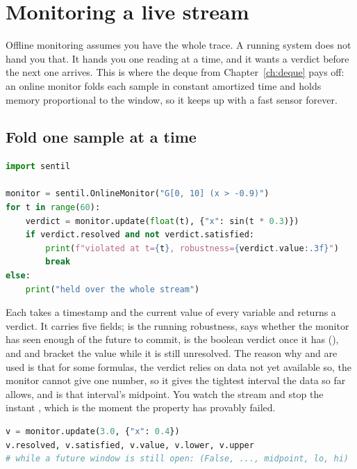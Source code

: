 \chapter{Monitoring a live stream}
\label{ch:online}

Offline monitoring assumes you have the whole trace. A running system does not hand you that. It hands you one reading at a time, and it wants a verdict before the next one arrives. This is where the deque from Chapter~\ref{ch:deque} pays off: an online monitor folds each sample in constant amortized time and holds memory proportional to the window, so it keeps up with a fast sensor forever.

\section{Fold one sample at a time}

\begin{lstlisting}[language=Python]
import sentil

monitor = sentil.OnlineMonitor("G[0, 10] (x > -0.9)")
for t in range(60):
    verdict = monitor.update(float(t), {"x": sin(t * 0.3)})
    if verdict.resolved and not verdict.satisfied:
        print(f"violated at t={t}, robustness={verdict.value:.3f}")
        break
else:
    print("held over the whole stream")
\end{lstlisting}

Each  takes a timestamp and the current value of every variable and returns a  verdict. It carries five fields;  is the running robustness,  says whether the monitor has seen enough of the future to commit,  is the boolean verdict once it has (), and  and  bracket the value while it is still unresolved. The reason why  and  are used is that for some formulas, the verdict relies on data not yet available so, the monitor cannot give one number, so it gives the tightest interval the data so far allows, and  is that interval's midpoint. You watch the stream and stop the instant , which is the moment the property has provably failed.

\begin{lstlisting}[language=Python]
v = monitor.update(3.0, {"x": 0.4})
v.resolved, v.satisfied, v.value, v.lower, v.upper
# while a future window is still open: (False, ..., midpoint, lo, hi)
\end{lstlisting}


